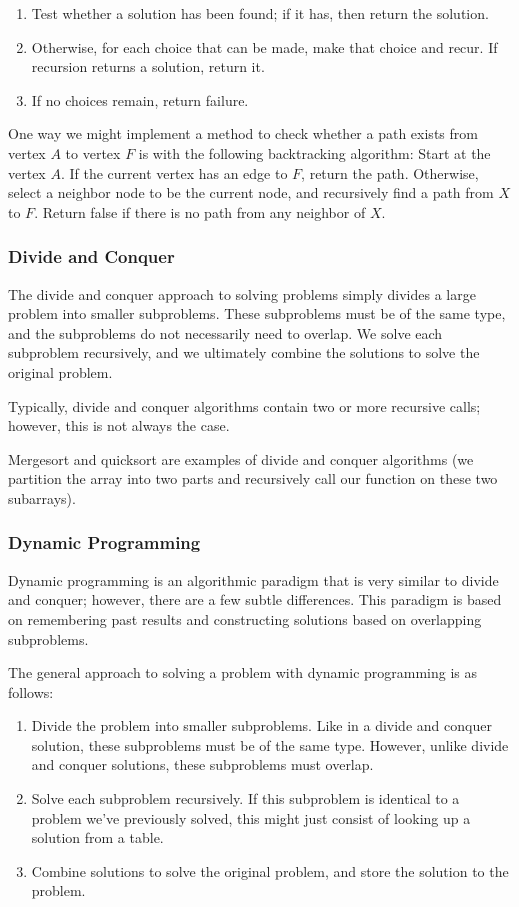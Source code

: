 \begin{enumerate}
    \item Test whether a solution has been found; if it has, then return the solution.
    \item Otherwise, for each choice that can be made, make that choice and recur. If recursion returns a solution, return it.
    \item If no choices remain, return failure.
\end{enumerate}

One way we might implement a method to check whether a path exists from vertex $A$ to vertex $F$ is with the following backtracking algorithm: Start at the vertex $A$. If the current vertex has an edge to $F$, return the path. Otherwise, select a neighbor node to be the current node, and recursively find a path from $X$ to $F$. Return false if there is no path from any neighbor of $X$.


\subsubsection{Divide and Conquer}

The divide and conquer approach to solving problems simply divides a large problem into smaller subproblems. These subproblems must be of the same type, and the subproblems do not necessarily need to overlap. We solve each subproblem recursively, and we ultimately combine the solutions to solve the original problem.

Typically, divide and conquer algorithms contain two or more recursive calls; however, this is not always the case. 

Mergesort and quicksort are examples of divide and conquer algorithms (we partition the array into two parts and recursively call our function on these two subarrays).

\subsubsection{Dynamic Programming}

Dynamic programming is an algorithmic paradigm that is very similar to divide and conquer; however, there are a few subtle differences. This paradigm is based on remembering past results and constructing solutions based on overlapping subproblems.

The general approach to solving a problem with dynamic programming is as follows:

\begin{enumerate}
    \item Divide the problem into smaller subproblems. Like in a divide and conquer solution, these subproblems must be of the same type. However, unlike divide and conquer solutions, these subproblems must overlap.
    \item Solve each subproblem recursively. If this subproblem is identical to a problem we've previously solved, this might just consist of looking up a solution from a table.
    \item Combine solutions to solve the original problem, and store the solution to the problem.
\end{enumerate}

